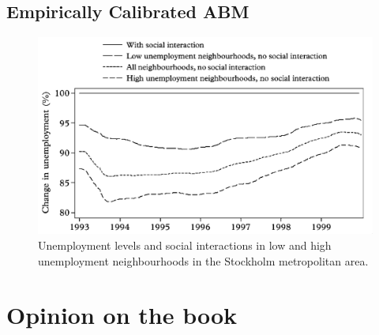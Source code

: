 \documentclass[11pt]{article}
\begin{document}
\subsection*{Empirically Calibrated ABM}
\label{sec:org3c859f4}
\begin{figure}[htbp]
\centering
\includegraphics[width=.9\linewidth]{eca.png}
\caption{Unemployment levels and social interactions in low and high unemployment neighbourhoods in the Stockholm metropolitan area.}
\end{figure}




\section*{Opinion on the book}
\label{sec:org100a588}
\end{document}
